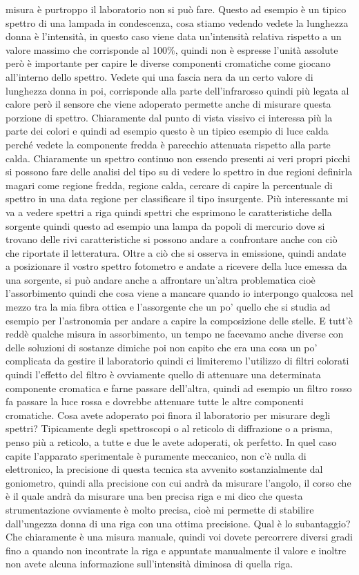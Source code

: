 {misura è purtroppo il laboratorio non si può fare. Questo ad esempio è un tipico spettro di una lampada in condescenza, cosa stiamo vedendo vedete la lunghezza donna è l'intensità, in questo caso viene data un'intensità relativa rispetto a un valore massimo che corrisponde al 100\%, quindi non è espresse l'unità assolute però è importante per capire le diverse componenti cromatiche come giocano all'interno dello spettro. Vedete qui una fascia nera da un certo valore di lunghezza donna in poi, corrisponde alla parte dell'infrarosso quindi più legata al calore però il sensore che viene adoperato permette anche di misurare questa porzione di spettro. Chiaramente dal punto di vista vissivo ci interessa più la parte dei colori e quindi ad esempio questo è un tipico esempio di luce calda perché vedete la componente fredda è parecchio attenuata rispetto alla parte calda. Chiaramente un spettro continuo non essendo presenti ai veri propri picchi si possono fare delle analisi del tipo su di vedere lo spettro in due regioni definirla magari come regione fredda, regione calda, cercare di capire la percentuale di spettro in una data regione per classificare il tipo insurgente. Più interessante mi va a vedere spettri a riga quindi spettri che esprimono le caratteristiche della sorgente quindi questo ad esempio una lampa da popoli di mercurio dove si trovano delle rivi caratteristiche si possono andare a confrontare anche con ciò che riportate il letteratura. Oltre a ciò che si osserva in emissione, quindi andate a posizionare il vostro spettro fotometro e andate a ricevere della luce emessa da una sorgente, si può andare anche a affrontare un'altra problematica cioè l'assorbimento quindi che cosa viene a mancare quando io interpongo qualcosa nel mezzo tra la mia fibra ottica e l'assorgente che un po' quello che si studia ad esempio per l'astronomia per andare a capire la composizione delle stelle. E tutt'è reddè qualche misura in assorbimento, un tempo ne facevamo anche diverse con delle soluzioni di sostanze dimiche poi non capito che era una cosa un po' complicata da gestire il laboratorio quindi ci limiteremo l'utilizzo di filtri colorati quindi l'effetto del filtro è ovviamente quello di attenuare una determinata componente cromatica e farne passare dell'altra, quindi ad esempio un filtro rosso fa passare la luce rossa e dovrebbe attenuare tutte le altre componenti cromatiche. Cosa avete adoperato poi finora il laboratorio per misurare degli spettri? Tipicamente degli spettroscopi o al reticolo di diffrazione o a prisma, penso più a reticolo, a tutte e due le avete adoperati, ok perfetto. In quel caso capite l'apparato sperimentale è puramente meccanico, non c'è nulla di elettronico, la precisione di questa tecnica sta avvenito sostanzialmente dal goniometro, quindi alla precisione con cui andrà da misurare l'angolo, il corso che è il quale andrà da misurare una ben precisa riga e mi dico che questa strumentazione ovviamente è molto precisa, cioè mi permette di stabilire dall'ungezza donna di una riga con una ottima precisione. Qual è lo subantaggio? Che chiaramente è una misura manuale, quindi voi dovete percorrere diversi gradi fino a quando non incontrate la riga e appuntate manualmente il valore e inoltre non avete alcuna informazione sull'intensità diminosa di quella riga. }
